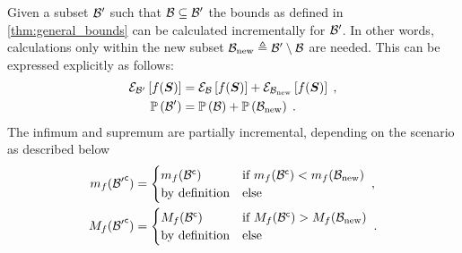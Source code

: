 \begin{corollaryE}
	\label{thm:incrementality}
	Given a subset $\subSpace^\prime$ such that $\subSpace\subseteq\subSpace^\prime$ the bounds as defined in \cref{thm:general_bounds} can be calculated incrementally for $\subSpace^\prime$.  In other words, calculations only within the new subset $\subSpace_{\textrm{\textup{new}}}\triangleq\subSpace^\prime\setminus\subSpace$ are needed. This can be expressed explicitly as follows:
	\begin{align}
		\partialexpectation{f(\RV)}{\subSpace^\prime} & =\partialexpectation{f(\RV)}{\subSpace}+\partialexpectation{f(\RV)}{\subSpace_{\textrm{\textup{new}}}}\;,
		\\
		\measure{\subSpace^\prime}& =\measure{\subSpace}+\measure{\subSpace_{\textrm{\textup{new}}}}\;.
	\end{align}
	The infimum and supremum are partially incremental, depending on the scenario as described below
	\begin{subequations}
		\begin{align}
			m_f(\stcomp{\subSpace^\prime})
			& =\begin{cases}
				m_f(\stcomp{\subSpace}) & \textup{if}\ m_f(\stcomp{\subSpace})<m_f(\subSpace_{\textrm{\textup{new}}}) \\
				\textup{by definition}  & \textup{else}
			\end{cases}\;, \\
			M_f(\stcomp{\subSpace^\prime})
			& =\begin{cases}
				M_f(\stcomp{\subSpace}) & \textup{if}\ M_f(\stcomp{\subSpace})>M_f(\subSpace_{\textrm{\textup{new}}}) \\
				\textup{by definition}  & \textup{else}
			\end{cases}\;.
		\end{align}
	\end{subequations}
\end{corollaryE}
